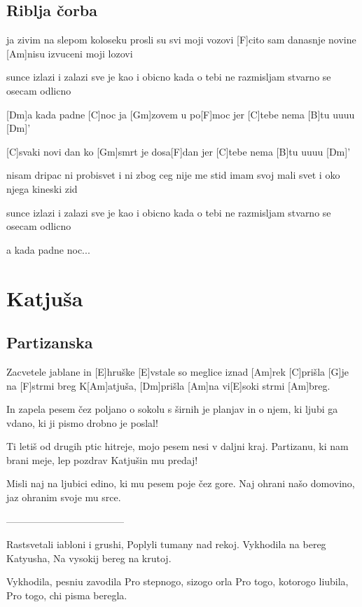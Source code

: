 \documentclass[a4paper,12pt]{article}
\begin{document}
\begin{multicols}{2}
\subsection*{Riblja čorba}
\begin{guitar}
[Am]ja zivim na slepom koloseku
prosli su svi moji vozovi
[F]cito sam danasnje novine
[Am]nisu izvuceni moji lozovi


sunce izlazi i zalazi
sve je kao i obicno
kada o tebi ne razmisljam
stvarno se osecam odlicno


[Dm]a kada padne [C]noc
ja [Gm]zovem u po[F]moc
jer [C]tebe nema [B]tu uuuu [Dm]'


[C]svaki novi dan
ko [Gm]smrt je dosa[F]dan
jer [C]tebe nema [B]tu uuuu [Dm]'


nisam dripac ni probisvet
i ni zbog ceg nije me stid
imam svoj mali svet
i oko njega kineski zid


sunce izlazi i zalazi
sve je kao i obicno
kada o tebi ne razmisljam
stvarno se osecam odlicno


a kada padne noc...

\end{guitar}
\section{Katjuša}
\subsection*{Partizanska}
\begin{guitar}
[Am]Zacvetele jablane in [E]hruške
[E]vstale so meglice iznad [Am]rek
[C]prišla [G]je na [F]strmi breg K[Am]atjuša,
[Dm]prišla [Am]na vi[E]soki strmi [Am]breg.


In zapela pesem čez poljano
o sokolu s širnih je planjav
in o njem, ki ljubi ga vdano,
ki ji pismo drobno je poslal!


Ti letiš od drugih ptic hitreje,
mojo pesem nesi v daljni kraj.
Partizanu, ki nam brani meje,
lep pozdrav Katjušin mu predaj!


Misli naj na ljubici edino,
ki mu pesem poje čez gore.
Naj ohrani našo domovino,
jaz ohranim svoje mu srce.

------------------------------------

Rastsvetali iabloni i grushi,
Poplyli tumany nad rekoj.
Vykhodila na bereg Katyusha,
Na vysokij bereg na krutoj.


Vykhodila, pesniu zavodila
Pro stepnogo, sizogo orla
Pro togo, kotorogo liubila,
Pro togo, chi pisma beregla.



\end{guitar}
\end{multicols}
\end{document}
